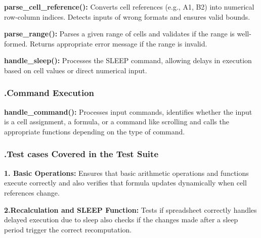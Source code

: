 \documentclass{styles}
\begin{document}
\noindent
{\fontsize{14pt}{11pt} \selectfont \textbf{parse\_cell\_reference():}}  
{\fontsize{14pt}{11pt} \selectfont  Converts cell references (e.g., A1, B2) into numerical row-column indices. Detects inputs of wrong formats and ensures valid bounds.}

\vspace{3pt} %

\noindent
{\fontsize{14pt}{11pt} \selectfont \textbf{parse\_range():}}  
{\fontsize{14pt}{11pt} \selectfont Parses a given range of cells and validates if the range is well-formed. Returns appropriate error message if the range is invalid.}

\vspace{3pt} %

\noindent
{\fontsize{14pt}{11pt} \selectfont \textbf{handle\_sleep():}}  
{\fontsize{14pt}{11pt} \selectfont Processes the SLEEP command, allowing delays in execution based on cell values or direct numerical input.}

\subsubsection*{\fontsize{14}{11} \selectfont .Command Execution}

\noindent
{\fontsize{14pt}{11pt} \selectfont \textbf{handle\_command():}}  
{\fontsize{14pt}{11pt} \selectfont  Processes input commands, identifies whether the input is a cell assignment, a formula, or a command like scrolling and calls the appropriate functions depending on the type of command.}

\vspace{3pt} %
\newpage


\subsubsection*{\fontsize{15}{11} \selectfont .Test cases Covered in the Test Suite}
\vspace{4pt}
\noindent
{\fontsize{14pt}{11pt} \selectfont \textbf{1. Basic Operations:}}  
{\fontsize{14pt}{11pt} \selectfont  Ensures that basic arithmetic operations and functions execute correctly and also verifies that formula updates dynamically when cell references change.}

\vspace{6pt} %

\noindent
{\fontsize{14pt}{11pt} \selectfont \textbf{2.Recalculation and SLEEP Function:}}  
{\fontsize{14pt}{11pt} \selectfont Tests if spreadsheet correctly handles delayed execution due to sleep also checks if the changes made after a sleep period trigger the correct recomputation.}
\end{document}
